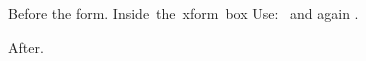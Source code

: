 \documentclass{article}
\begin{document}
Before the form.
\hbox{Inside the xform box}%
\immediate{}
\noindent Use: \pdfrefxform\pdflastxform\ and again
\pdfrefxform\pdflastxform.

After.
\end{document}
